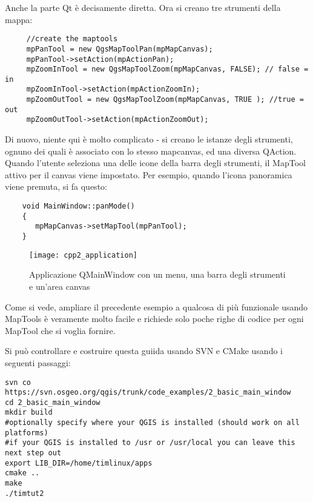 Anche la parte Qt è decisamente diretta. Ora si creano tre strumenti della mappa:

\begin{verbatim}
     //create the maptools
     mpPanTool = new QgsMapToolPan(mpMapCanvas);
     mpPanTool->setAction(mpActionPan);
     mpZoomInTool = new QgsMapToolZoom(mpMapCanvas, FALSE); // false = in
     mpZoomInTool->setAction(mpActionZoomIn);
     mpZoomOutTool = new QgsMapToolZoom(mpMapCanvas, TRUE ); //true = out
     mpZoomOutTool->setAction(mpActionZoomOut);
\end{verbatim}

Di nuovo, niente qui è molto complicato - si creano le istanze degli strumenti, ognuno dei quali è associato con lo stesso mapcanvas, ed una diversa QAction. Quando l'utente seleziona una delle icone della barra degli strumenti, il MapTool attivo per il canvas viene impostato. Per esempio, quando l'icona panoramica viene premuta, si fa questo:

\begin{verbatim}
    void MainWindow::panMode()
    {
       mpMapCanvas->setMapTool(mpPanTool); 
    }
\end{verbatim}

\begin{figure}[ht]
   \begin{center}
   \caption{Applicazione QMainWindow con un menu, una barra degli strumenti e un'area canvas
\osxcaption}\label{fig:cpp2_application}\smallskip
   \texttt{[image: cpp2\_application]}
\end{center}
\end{figure}


Come si vede, ampliare il precedente esempio a qualcosa di più funzionale usando MapTools è veramente molto facile e richiede solo poche righe di codice per ogni MapTool che si voglia fornire.

Si può controllare e costruire questa guiida usando SVN e CMake usando i seguenti passaggi:

\begin{verbatim}
svn co https://svn.osgeo.org/qgis/trunk/code_examples/2_basic_main_window
cd 2_basic_main_window
mkdir build
#optionally specify where your QGIS is installed (should work on all platforms)
#if your QGIS is installed to /usr or /usr/local you can leave this next step out
export LIB_DIR=/home/timlinux/apps
cmake ..
make
./timtut2
\end{verbatim}


